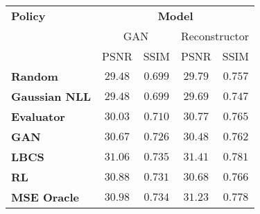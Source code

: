 
\begin{tabular}{lcccc}
    \toprule
    \multirow{1}{*}{\textbf{Policy}}& \multicolumn{4}{c}{\textbf{Model}}\\
    & \multicolumn{2}{c}{GAN} & \multicolumn{2}{c}{Reconstructor}\\
    \cmidrule(r){2-3}\cmidrule(l){4-5}
    & \textsc{PSNR}& \textsc{SSIM}& \textsc{PSNR}& \textsc{SSIM}\\
    \midrule
    \textbf{Random}& $29.48$& $0.699$& $29.79$& $0.757$\\
    \textbf{Gaussian NLL}& $29.48$& $0.699$& $29.69$& $0.747$\\
    \textbf{Evaluator}& $30.03$& $0.710$& $30.77$& $0.765$ \\
    \textbf{GAN}& $30.67$& $0.726$ & $30.48$ & $0.762$\\
    \midrule
    \textbf{LBCS}& $\mathbf{31.06}$& $\mathbf{0.735}$& $\mathbf{31.41}$& $\mathbf{0.781}$\\
    \textbf{RL}& $30.88$& $0.731$ & $30.68$& $0.766$\\
    \midrule
    \textbf{MSE Oracle}& $30.98$& $0.734$ & $31.23$& $0.778$\\
    \bottomrule
\end{tabular}